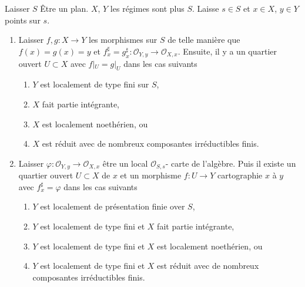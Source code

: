 \begin{lemma}

\label{lemma-morphism-defined-local-ring}

Laisser $S$ Être un plan. $X$, $Y$ les régimes sont plus $S$. Laisse $s \in S$ et $x \in X$, $y \in Y$ points sur $s$.

\begin{enumerate}

\item Laisser $f, g : X \to Y$ les morphismes sur $S$ de telle manière que
$f(x) = g(x) = y$ et
$f^\sharp_x = g^\sharp_x : \mathcal{O}_{Y, y} \to \mathcal{O}_{X, x}$. Ensuite, il y a un quartier ouvert $U \subset X$ avec
$f|_U = g|_U$ dans les cas suivants

\begin{enumerate}

\item  $Y$ est localement de type fini sur $S$,
\item  $X$ fait partie intégrante,
\item  $X$ est localement noethérien, ou
\item  $X$ est réduit avec de nombreux composantes irréductibles finis.

\end{enumerate}

\item Laisser $\varphi : \mathcal{O}_{Y, y} \to \mathcal{O}_{X, x}$
être un local $\mathcal{O}_{S, s}$- carte de l'algèbre. Puis il existe un quartier ouvert $U \subset X$ de $x$ et un morphisme $f : U \to Y$
cartographie $x$ à $y$ avec $f^\sharp_x = \varphi$ dans les cas suivants

\begin{enumerate}

\item  $Y$ est localement de présentation finie over $S$,
\item  $Y$ est localement de type fini et $X$ fait partie intégrante,
\item  $Y$ est localement de type fini et $X$ est localement noethérien, ou
\item  $Y$ est localement de type fini et $X$ est réduit avec de nombreux composantes irréductibles finis.

\end{enumerate}

\end{enumerate}

\end{lemma}

